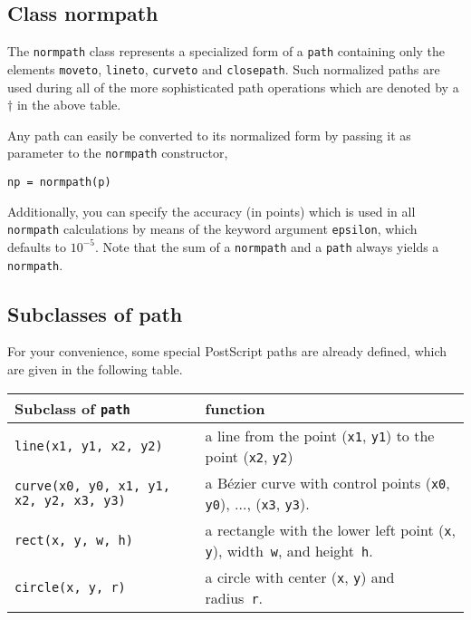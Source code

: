 \subsection{Class normpath}

The \texttt{normpath} class represents a specialized form of a
\texttt{path} containing only the elements \verb|moveto|,
\verb|lineto|, \verb|curveto| and \verb|closepath|. Such normalized
paths are used during all of the more sophisticated path operations
which are denoted by a $\dagger$ in the above table.


Any path can easily be converted to its normalized form by passing it
as parameter to the \texttt{normpath} constructor,
\begin{verbatim}
np = normpath(p)
\end{verbatim}
Additionally, you can specify the accuracy (in points) which is used
in all \verb|normpath| calculations by means of the keyword argument
\verb|epsilon|, which defaults to $10^{-5}$.  Note that the sum of a
\verb|normpath| and a \verb|path| always yields a \verb|normpath|.

\subsection{Subclasses of path}

For your convenience, some special PostScript paths are already defined, which
are given in the following table.

\medskip
\begin{tabularx}{\linewidth}{l>{\raggedright\arraybackslash}X}
Subclass of \texttt{path} & function \\
\hline
\texttt{line(x1, y1, x2, y2)} & a line from the point
  (\texttt{x1}, \texttt{y1}) to the point (\texttt{x2}, \texttt{y2})\\
\texttt{curve(x0, y0, x1, y1, x2, y2, x3, y3)} & a B\'ezier curve with 
control points  (\texttt{x0}, \texttt{y0}), $\dots$, (\texttt{x3}, \texttt{y3}).\\
\texttt{rect(x, y, w, h)} &  a rectangle with the
  lower left point (\texttt{x}, \texttt{y}), width~\texttt{w}, and
  height~\texttt{h}. \\
\texttt{circle(x, y, r)} & a circle with 
  center (\texttt{x}, \texttt{y}) and radius~\texttt{r}.
\end{tabularx}
\medskip





